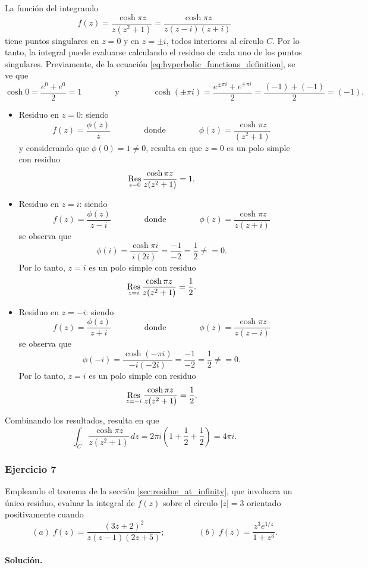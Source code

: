 \documentclass[a4paper]{report}
\def\Res{\qopname\relax m{Res}}
\begin{document}
La función del integrando 
\[
 f(z)=\frac{\cosh\pi z}{z(z^2+1)}=\frac{\cosh\pi z}{z(z-i)(z+i)}
\]
tiene puntos singulares en \(z=0\) y en \(z=\pm i\), todos interiores al círculo \(C\). Por lo tanto, la integral puede evaluarse calculando el residuo de cada uno de los puntos singulares. Previamente, de la ecuación \ref{eq:hyperbolic_functions_definition}, se ve que 
\[
 \cosh0=\frac{e^0+e^0}{2}=1
 \qquad\qquad\textrm{y}\qquad\qquad
 \cosh(\pm\pi i)=\frac{e^{\pm\pi i}+e^{\mp\pi i}}{2}=\frac{(-1)+(-1)}{2}=(-1).
\]
\begin{itemize}
 \item Residuo en \(z=0\): siendo
 \[
  f(z)=\frac{\phi(z)}{z}
  \qquad\qquad\textrm{donde}\qquad\qquad
  \phi(z)=\frac{\cosh\pi z}{(z^2+1)}
 \]
 y considerando que \(\phi(0)=1\neq0\), resulta en que \(z=0\) es un polo simple con residuo
 \[
  \Res_{z=0}\frac{\cosh\pi z}{z(z^2+1)}=1.
 \]
 \item Residuo en \(z=i\): siendo
 \[
  f(z)=\frac{\phi(z)}{z-i}
  \qquad\qquad\textrm{donde}\qquad\qquad
  \phi(z)=\frac{\cosh\pi z}{z(z+i)}
 \]
 se observa que
 \[
  \phi(i)=\frac{\cosh\pi i}{i(2i)}=\frac{-1}{-2}=\frac{1}{2}\neq=0.
 \]
 Por lo tanto, \(z=i\) es un polo simple con residuo
 \[
  \Res_{z=i}\frac{\cosh\pi z}{z(z^2+1)}=\frac{1}{2}.
 \]
 \item Residuo en \(z=-i\): siendo
 \[
  f(z)=\frac{\phi(z)}{z+i}
  \qquad\qquad\textrm{donde}\qquad\qquad
  \phi(z)=\frac{\cosh\pi z}{z(z-i)}
 \]
 se observa que
 \[
  \phi(-i)=\frac{\cosh(-\pi i)}{-i(-2i)}=\frac{-1}{-2}=\frac{1}{2}\neq=0.
 \]
 Por lo tanto, \(z=i\) es un polo simple con residuo
 \[
  \Res_{z=-i}\frac{\cosh\pi z}{z(z^2+1)}=\frac{1}{2}.
 \]
\end{itemize}
Combinando los resultados, resulta en que 
\[
 \int_C\frac{\cosh\pi z}{z(z^2+1)}\,dz=2\pi i\left(1+\frac{1}{2}+\frac{1}{2}\right)=4\pi i.
\] 
 
\subsubsection*{Ejercicio 7}

Empleando el teorema de la sección \ref{sec:residue_at_infinity}, que involucra un único residuo, evaluar la integral de \(f(z)\) sobre el círculo \(|z|=3\) orientado positivamente cuando 
\[
 (\textit{a})\;f(z)=\frac{(3z+2)^2}{z(z-1)(2z+5)};\qquad\qquad(\textit{b})\;f(z)=\frac{z^3e^{1/z}}{1+z^3}.
\]

\paragraph{Solución.}
\end{document}
